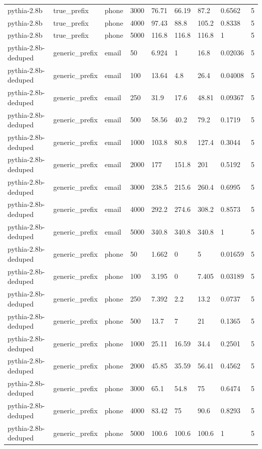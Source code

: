 \begin{tabular}{lllllllll}
pythia-2.8b & true\_prefix & phone & 3000 & 76.71 & 66.19 & 87.2 & 0.6562 & 5 \\
pythia-2.8b & true\_prefix & phone & 4000 & 97.43 & 88.8 & 105.2 & 0.8338 & 5 \\
pythia-2.8b & true\_prefix & phone & 5000 & 116.8 & 116.8 & 116.8 & 1 & 5 \\
pythia-2.8b-deduped & generic\_prefix & email & 50 & 6.924 & 1 & 16.8 & 0.02036 & 5 \\
pythia-2.8b-deduped & generic\_prefix & email & 100 & 13.64 & 4.8 & 26.4 & 0.04008 & 5 \\
pythia-2.8b-deduped & generic\_prefix & email & 250 & 31.9 & 17.6 & 48.81 & 0.09367 & 5 \\
pythia-2.8b-deduped & generic\_prefix & email & 500 & 58.56 & 40.2 & 79.2 & 0.1719 & 5 \\
pythia-2.8b-deduped & generic\_prefix & email & 1000 & 103.8 & 80.8 & 127.4 & 0.3044 & 5 \\
pythia-2.8b-deduped & generic\_prefix & email & 2000 & 177 & 151.8 & 201 & 0.5192 & 5 \\
pythia-2.8b-deduped & generic\_prefix & email & 3000 & 238.5 & 215.6 & 260.4 & 0.6995 & 5 \\
pythia-2.8b-deduped & generic\_prefix & email & 4000 & 292.2 & 274.6 & 308.2 & 0.8573 & 5 \\
pythia-2.8b-deduped & generic\_prefix & email & 5000 & 340.8 & 340.8 & 340.8 & 1 & 5 \\
pythia-2.8b-deduped & generic\_prefix & phone & 50 & 1.662 & 0 & 5 & 0.01659 & 5 \\
pythia-2.8b-deduped & generic\_prefix & phone & 100 & 3.195 & 0 & 7.405 & 0.03189 & 5 \\
pythia-2.8b-deduped & generic\_prefix & phone & 250 & 7.392 & 2.2 & 13.2 & 0.0737 & 5 \\
pythia-2.8b-deduped & generic\_prefix & phone & 500 & 13.7 & 7 & 21 & 0.1365 & 5 \\
pythia-2.8b-deduped & generic\_prefix & phone & 1000 & 25.11 & 16.59 & 34.4 & 0.2501 & 5 \\
pythia-2.8b-deduped & generic\_prefix & phone & 2000 & 45.85 & 35.59 & 56.41 & 0.4562 & 5 \\
pythia-2.8b-deduped & generic\_prefix & phone & 3000 & 65.1 & 54.8 & 75 & 0.6474 & 5 \\
pythia-2.8b-deduped & generic\_prefix & phone & 4000 & 83.42 & 75 & 90.6 & 0.8293 & 5 \\
pythia-2.8b-deduped & generic\_prefix & phone & 5000 & 100.6 & 100.6 & 100.6 & 1 & 5 \\

\end{tabular}
